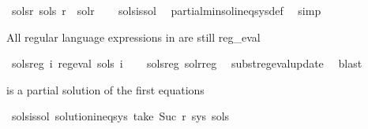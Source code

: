 \begin{isabellebody}
\isanewline
\isanewline
{}\isamarkupfalse%
\ sols{\isacharprime}{\kern0pt}{\isacharunderscore}{\kern0pt}r{\isacharcolon}{\kern0pt}\ {\isachardoublequoteopen}sols{\isacharprime}{\kern0pt}\ r\ {\isacharequal}{\kern0pt}\ sol{\isacharunderscore}{\kern0pt}r{\isachardoublequoteclose}\isanewline
%
\isadelimproof
\ \ %
\endisadelimproof
%
\isatagproof
{}\isamarkupfalse%
\ sols{\isacharunderscore}{\kern0pt}is{\isacharunderscore}{\kern0pt}sol\ \isamarkupfalse%
\ partial{\isacharunderscore}{\kern0pt}min{\isacharunderscore}{\kern0pt}sol{\isacharunderscore}{\kern0pt}ineq{\isacharunderscore}{\kern0pt}sys{\isacharunderscore}{\kern0pt}def\ \isamarkupfalse%
\ simp%
\endisatagproof
{\isafoldproof}%
%
\isadelimproof
%
\endisadelimproof
%
\begin{isamarkuptext}%
All regular language expressions in  are still reg_eval%
\end{isamarkuptext}\isamarkuptrue%
\isamarkupfalse%
\ sols{\isacharprime}{\kern0pt}{\isacharunderscore}{\kern0pt}reg{\isacharcolon}{\kern0pt}\ {\isachardoublequoteopen}{\isasymforall}i{\isachardot}{\kern0pt}\ reg{\isacharunderscore}{\kern0pt}eval\ {\isacharparenleft}{\kern0pt}sols{\isacharprime}{\kern0pt}\ i{\isacharparenright}{\kern0pt}{\isachardoublequoteclose}\isanewline
%
\isadelimproof
\ \ %
\endisadelimproof
%
\isatagproof
{}\isamarkupfalse%
\ sols{\isacharunderscore}{\kern0pt}reg\ sol{\isacharunderscore}{\kern0pt}r{\isacharunderscore}{\kern0pt}reg\ \isamarkupfalse%
\ subst{\isacharunderscore}{\kern0pt}reg{\isacharunderscore}{\kern0pt}eval{\isacharunderscore}{\kern0pt}update\ \isamarkupfalse%
\ blast%
\endisatagproof
{\isafoldproof}%
%
\isadelimproof
%
\endisadelimproof
%
\begin{isamarkuptext}%
 is a partial solution of the first  equations%
\end{isamarkuptext}\isamarkuptrue%
\isamarkupfalse%
\ sols{\isacharprime}{\kern0pt}{\isacharunderscore}{\kern0pt}is{\isacharunderscore}{\kern0pt}sol{\isacharcolon}{\kern0pt}\ {\isachardoublequoteopen}solution{\isacharunderscore}{\kern0pt}ineq{\isacharunderscore}{\kern0pt}sys\ {\isacharparenleft}{\kern0pt}take\ {\isacharparenleft}{\kern0pt}Suc\ r{\isacharparenright}{\kern0pt}\ sys{\isacharparenright}{\kern0pt}\ sols{\isacharprime}{\kern0pt}{\isachardoublequoteclose}\isanewline
%
\isadelimproof
%
\endisadelimproof

\end{isabellebody}
